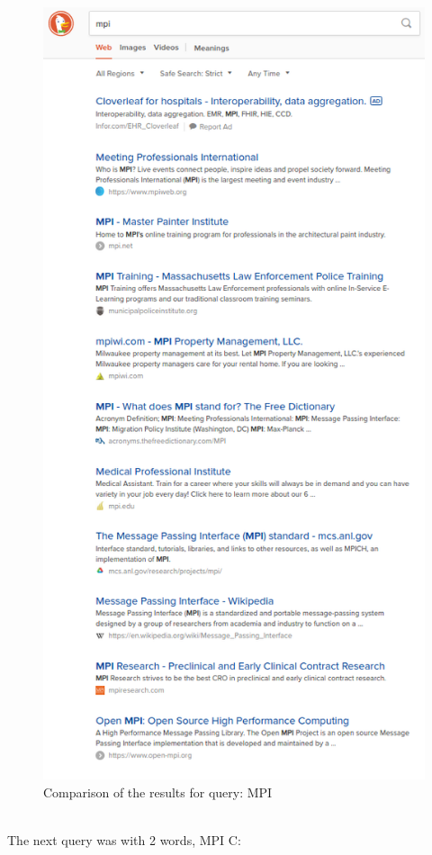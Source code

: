 \documentclass{article}
\begin{document}
\begin{figure}
	\includegraphics[scale=0.5]{ddg_mpi.png}
	\caption{Comparison of the results for query: MPI}
	\label{fig:mpi}
\end{figure}
\\The next query was with 2 words, MPI C:
\end{document}
